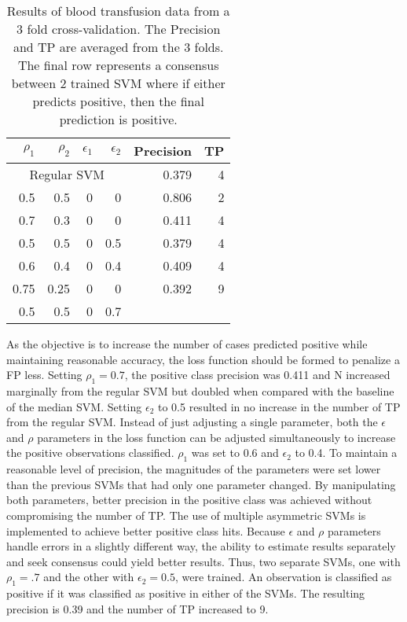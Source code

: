 \begin{table}[htp]
\begin{tabular}{rrrr|rr}
\hline
$\rho_1$ & $\rho_2$ & $\epsilon_1$ & $\epsilon_2$ & Precision & TP \bigstrut\\
\hline
\hline
 \multicolumn{4}{c|}{Regular SVM}     & 0.379 & 4 \bigstrut\\
\hline
0.5   & 0.5   & 0     & 0     & 0.806 & 2 \bigstrut\\
\hline
0.7   & 0.3   & 0     & 0     & 0.411 & 4 \bigstrut\\
\hline
0.5   & 0.5   & 0     & 0.5   & 0.379 & 4 \bigstrut\\
\hline
0.6   & 0.4   & 0     & 0.4   & 0.409 & 4 \bigstrut\\
\hline
0.75  & 0.25  & 0     & 0     & 0.392 & 9 \bigstrut[t]\\
0.5   & 0.5   & 0     & 0.7   &       &  \bigstrut[b]\\
\hline
\hline
\end{tabular}%
\caption{Results of blood transfusion data from a 3 fold cross-validation. The Precision and TP are averaged from the 3 folds. The final row represents a consensus between 2 trained SVM where if either predicts positive, then the final prediction is positive.}
\label{bloodtransfusion}
\end{table}

As the objective is to increase the number of cases predicted positive while maintaining reasonable accuracy, the loss function should be formed to penalize a FP less. Setting $\rho_1=0.7$, the positive class precision was 0.411 and N increased marginally from the regular SVM but doubled when compared with the baseline of the median SVM. Setting $\epsilon_2$ to 0.5 resulted in no increase in the number of TP from the regular SVM. Instead of just adjusting a single parameter, both the $\epsilon$ and $\rho$ parameters in the loss function can be adjusted simultaneously to increase the positive observations classified. $\rho_1$ was set to 0.6 and $\epsilon_2$ to 0.4. To maintain a reasonable level of precision, the magnitudes of the parameters were set lower than the previous SVMs that had only one parameter changed. By manipulating both parameters, better precision in the positive class was achieved without compromising the number of TP. The use of multiple asymmetric SVMs is implemented to achieve better positive class hits. Because $\epsilon$ and $\rho$ parameters handle errors in a slightly different way, the ability to estimate results separately and seek consensus could yield better results. Thus, two separate SVMs, one with $\rho_1=.7$ and the other with $\epsilon_2=0.5$, were trained. An observation is classified as positive if it was classified as positive in either of the SVMs. The resulting precision is 0.39 and the number of TP increased to 9.

